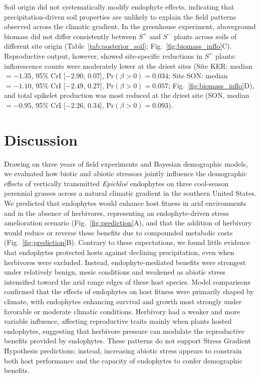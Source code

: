 \documentclass[12pt]{article}\usepackage[]{graphicx}\usepackage[dvipsnames]{xcolor}
\begin{document}
Soil origin did not systematically modify endophyte effects, indicating that precipitation-driven soil properties are unlikely to explain the field patterns observed across the climatic gradient.
In the greenhouse experiment, aboveground biomass did not differ consistently between $S^{+}$ and $S^{-}$ plants across soils of different site origin (Table~\ref{tab:posterior_soil}; Fig.~\ref{fig:biomass_inflo}C).
Reproductive output, however, showed site-specific reductions in $S^{+}$ plants: inflorescence counts were moderately lower at the driest sites (Site KER: median $= -1.35$, 95\% CrI [$-2.90$, $0.07$], $\mathrm{Pr}(\beta > 0) = 0.034$; Site SON: median $= -1.10$, 95\% CrI [$-2.49$, $0.27$], $\mathrm{Pr}(\beta > 0) = 0.057$; Fig.~\ref{fig:biomass_inflo}D), and total spikelet production was most reduced at the driest site (SON, median $= -0.95$, 95\% CrI [$-2.26$, $0.34$], $\mathrm{Pr}(\beta > 0) = 0.093$).

\section*{Discussion}

Drawing on three years of field experiments and Bayesian demographic models, we evaluated how biotic and abiotic stressors jointly influence the demographic effects of vertically transmitted \textit{Epichloë} endophytes on three cool-season perennial grasses across a natural climatic gradient in the southern United States.  
We predicted that endophytes would enhance host fitness in arid environments and in the absence of herbivores, representing an endophyte-driven stress amelioration scenario (Fig.~\ref{fig:prediction}A), and that the addition of herbivory would reduce or reverse these benefits due to compounded metabolic costs (Fig.~\ref{fig:prediction}B).  
Contrary to these expectations, we found little evidence that endophytes protected hosts against declining precipitation, even when herbivores were excluded.  
Instead, endophyte-mediated benefits were strongest under relatively benign, mesic conditions and weakened as abiotic stress intensified toward the arid range edges of these host species.  
Model comparisons confirmed that the effects of endophytes on host fitness were primarily shaped by climate, with endophytes enhancing survival and growth most strongly under favorable or moderate climatic conditions. 
Herbivory had a weaker and more variable influence, affecting reproductive traits mainly when plants hosted endophytes, suggesting that herbivore pressure can modulate the reproductive benefits provided by endophytes.
These patterns do not support Stress Gradient Hypothesis predictions; instead, increasing abiotic stress appears to constrain both host performance and the capacity of endophytes to confer demographic benefits.
\end{document}
